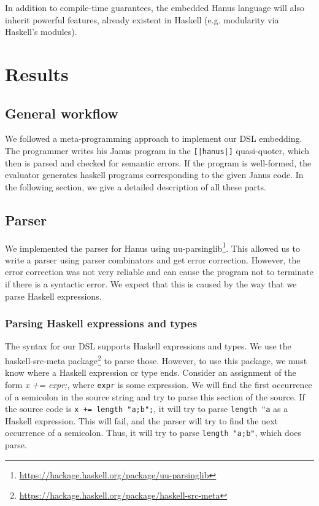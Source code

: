 \documentclass[12pt,a4paper]{article}
\newcommand{\inlinehs}[1]{\texttt{#1}}
\begin{document}
In addition to compile-time guarantees, the embedded Hanus language will also inherit powerful features, already existent in Haskell (e.g. modularity via Haskell's modules).

\section{Results}
\label{section:results}

\subsection{General workflow}
We followed a meta-programming approach to implement our DSL embedding. The programmer writes his Janus program in the 
\inlinehs{[|hanus|]} quasi-quoter, which then is parsed and checked for semantic errors. If the program is well-formed, the evaluator generates haskell programs corresponding to the given Janus code. In the following section, we give a detailed description of all these parts.

\subsection{Parser}
We implemented the parser for Hanus using uu-parsinglib\footnote{\url{https://hackage.haskell.org/package/uu-parsinglib}}. This allowed us to write a parser using parser combinators and get error correction. However, the error correction was not very reliable and can cause the program not to terminate if there is a syntactic error. We expect that this is caused by the way that we parse Haskell expressions.

\subsubsection{Parsing Haskell expressions and types}
The syntax for our DSL supports Haskell expressions and types. We use the haskell-src-meta package\footnote{\url{https://hackage.haskell.org/package/haskell-src-meta}} to parse those. However, to use this package, we must know where a Haskell expression or type ends. Consider an assignment of the form \textit{x += expr;}, where \texttt{expr} is some expression. We will find the first occurrence of a semicolon in the source string and try to parse this section of the source. If the source code is \texttt{x += length "a;b";}, it will try to parse \texttt{length "a} as a Haskell expression. This will fail, and the parser will try to find the next occurrence of a semicolon. Thus, it will try to parse \texttt{length "a;b"}, which does parse.
\end{document}
